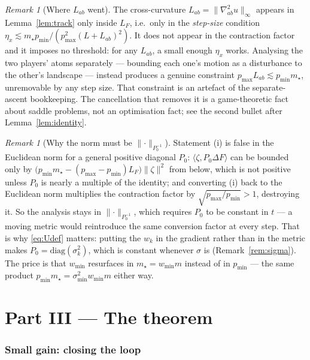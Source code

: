 \documentclass[11pt,a4paper]{article}
\theoremstyle{plain}
\theoremstyle{definition}
\theoremstyle{remark}
\newtheorem{remark}[theorem]{Remark}
\newcommand{\ip}[2]{\langle #1, #2\rangle}
\newcommand{\norm}[1]{\lVert #1 \rVert}
\begin{document}
\begin{remark}[Where $L_{ab}$ went]\label{rem:noLab}
The cross-curvature $L_{ab}=\norm{\nabla^2_{ab}u}_\infty$ appears in
Lemma~\ref{lem:track} only inside $L_F$, i.e.\ only in the \emph{step-size} condition
$\eta_x\lesssim m_\star p_{\min}/(p_{\max}^2(L+L_{ab})^2)$. It does not appear in the
contraction factor and it imposes no threshold: for any $L_{ab}$, a small enough $\eta_x$
works. Analysing the two players' atoms separately --- bounding each one's motion as a
disturbance to the other's landscape --- instead produces a genuine constraint
$p_{\max}L_{ab}\lesssim p_{\min}m_\star$, unremovable by any step size. That constraint
is an artefact of the separate-ascent bookkeeping. The cancellation that removes it is a
game-theoretic fact about saddle problems, not an optimisation fact; see the second
bullet after Lemma~\ref{lem:identity}.
\end{remark}

\begin{remark}[Why the norm must be $\norm{\cdot}_{P_0^{-1}}$]\label{rem:Pnorm}
Statement (i) is false in the Euclidean norm for a general positive diagonal $P_0$:
$\ip{\zeta}{P_0\Delta F}$ can be bounded only by
$\big(p_{\min}m_\star-(p_{\max}-p_{\min})L_F\big)\norm{\zeta}^2$ from below, which is not
positive unless $P_0$ is nearly a multiple of the identity; and converting (i) back to
the Euclidean norm multiplies the contraction factor by $\sqrt{p_{\max}/p_{\min}}>1$,
destroying it. So the analysis stays in $\norm{\cdot}_{P_0^{-1}}$, which requires $P_0$
to be constant in $t$ --- a moving metric would reintroduce the same conversion factor at
every step. That is why \eqref{eq:Udef} matters: putting the $w_k$ in the gradient rather
than in the metric makes $P_0=\mathrm{diag}(\sigma_k^2)$, which is constant whenever
$\sigma$ is (Remark~\ref{rem:sigma}). The price is that $w_{\min}$ resurfaces in
$m_\star=w_{\min}m$ instead of in $p_{\min}$ --- the same product
$p_{\min}m_\star=\sigma_{\min}^2w_{\min}m$ either way.
\end{remark}

\newpage
\part*{Part III --- The theorem}

\section{Small gain: closing the loop}\label{sec:main}
\end{document}
